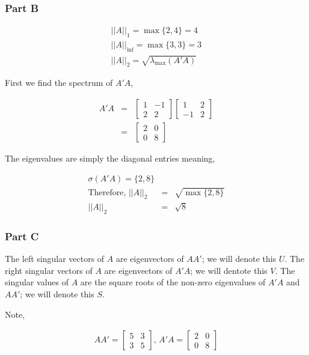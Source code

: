 \subsubsection{Part B}
\begin{eqnarray}
  || A ||_1 = \max \{2,4\} = \boxed{4} \\
  || A ||_{\inf} = \max \{3,3\} = \boxed{3} \\
  || A ||_2 = \sqrt{ \lambda_{\max} (A'A)}
\end{eqnarray}

First we find the spectrum of \(A'A\),

\begin{eqnarray}
  A'A &=&
  \begin{bmatrix}
    1 & -1 \\
    2 & 2
  \end{bmatrix}
  \begin{bmatrix}
    1 & 2 \\
    -1 & 2
  \end{bmatrix}
  \\
  &=&
  \begin{bmatrix}
    2 & 0 \\
    0 & 8
  \end{bmatrix}
\end{eqnarray}

The eigenvalues are simply the diagonal entries meaning,

\begin{eqnarray}
  \sigma(A'A) = \{2,8\} \\
  \text{Therefore, }
  ||A||_2 &=& \sqrt{\max \{2,8\}} \\
  ||A||_2 &=& \boxed{\sqrt{8}}
\end{eqnarray}

\subsubsection{Part C}
The left singular vectors of \(A\) are eigenvectors of \(AA'\); we will denote this \(U\).
The right singular vectors of \(A\) are eigenvectors of \(A'A\); we will dentote this \(V\).
The singular values of \(A\) are the square roots of the non-zero eigenvalues of \(A'A\) and \(AA'\); we will denote this \(S\).

Note,

\begin{eqnarray}
  AA' = 
  \begin{bmatrix}
    5 & 3 \\
    3 & 5
  \end{bmatrix}
  \text{,   }
  A'A = 
  \begin{bmatrix}
    2 & 0 \\
    0 & 8
  \end{bmatrix}
\end{eqnarray}

